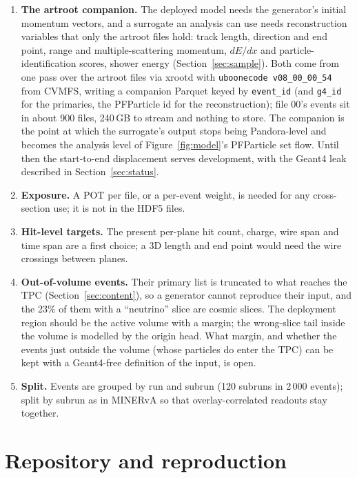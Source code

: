 \documentclass[10pt,letterpaper]{article}
\newcommand{\code}[1]{\texttt{#1}}
\newcommand{\pct}[1]{#1\%}
\begin{document}
\begin{enumerate}[nosep]
\item \textbf{The artroot companion.} The deployed model needs the generator's initial momentum vectors, and a
  surrogate an analysis can use needs reconstruction variables that only the artroot files hold: track length,
  direction and end point, range and multiple-scattering momentum, $dE/dx$ and particle-identification scores, shower
  energy (Section~\ref{sec:sample}). Both come from one pass over the artroot files via xrootd with
  \code{uboonecode v08\_00\_00\_54} from CVMFS, writing a companion Parquet keyed by \code{event\_id} (and
  \code{g4\_id} for the primaries, the PFParticle id for the reconstruction); file 00's events sit in about 900 files,
  240\,GB to stream and nothing to store. The companion is the point at which the surrogate's output stops being
  Pandora-level and becomes the analysis level of Figure~\ref{fig:model}'s PFParticle set flow. Until then the
  start-to-end displacement serves development, with the Geant4 leak described in Section~\ref{sec:status}.
\item \textbf{Exposure.} A POT per file, or a per-event weight, is needed for any cross-section use; it is not in the
  HDF5 files.
\item \textbf{Hit-level targets.} The present per-plane hit count, charge, wire span and time span are a first
  choice; a 3D length and end point would need the wire crossings between planes.
\item \textbf{Out-of-volume events.} Their primary list is truncated to what reaches the TPC
  (Section~\ref{sec:content}), so a generator cannot reproduce their input, and the \pct{23} of them with a ``neutrino''
  slice are cosmic slices. The deployment region should be the active volume with a margin; the wrong-slice tail inside
  the volume is modelled by the origin head. What margin, and whether the events just outside the volume (whose
  particles do enter the TPC) can be kept with a Geant4-free definition of the input, is open.
\item \textbf{Split.} Events are grouped by run and subrun (120 subruns in 2\,000 events); split by subrun as in MINERvA
  so that overlay-correlated readouts stay together.
\end{enumerate}

\section{Repository and reproduction}\label{sec:repo}
\end{document}
